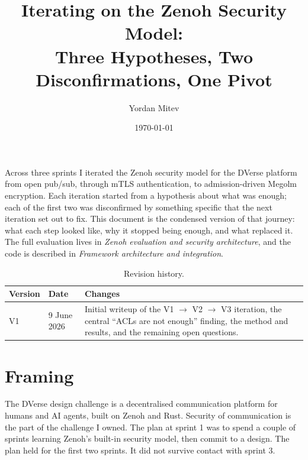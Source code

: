\documentclass[11pt,a4paper]{article}
\title{%
  \vspace{-1cm}
  {\LARGE\bfseries Iterating on the Zenoh Security Model:\\
  Three Hypotheses, Two Disconfirmations, One Pivot}
}
\author{Yordan Mitev}
\date{\today}
\begin{document}
\maketitle
\thispagestyle{fancy}

\begin{abstractbox}
  Across three sprints I iterated the Zenoh security model for the
  DVerse platform from open pub/sub, through mTLS authentication,
  to admission-driven Megolm encryption. Each iteration started
  from a hypothesis about what was enough; each of the first two
  was disconfirmed by something specific that the next iteration
  set out to fix. This document is the condensed version of that
  journey: what each step looked like, why it stopped being
  enough, and what replaced it. The full evaluation lives in
  \emph{Zenoh evaluation and security architecture}, and the code
  is described in \emph{Framework architecture and integration}.
\end{abstractbox}

\vspace{1em}

\begin{table}[H]
  \centering
  \small
  \begin{tabular}{|l|l|p{8cm}|}
    \hline
    \rowcolor{gray!15}
    \textbf{Version} & \textbf{Date} & \textbf{Changes} \\
    \hline
    V1 & 9 June 2026 & Initial writeup of the V1 \(\rightarrow\)
    V2 \(\rightarrow\) V3 iteration, the central ``ACLs are not
    enough'' finding, the method and results, and the remaining
    open questions. \\
    \hline
  \end{tabular}
  \caption{Revision history.}
  \label{tab:iter-history}
\end{table}

\newpage
\tableofcontents
\newpage

\section{Framing}

The DVerse design challenge is a decentralised communication
platform for humans and AI agents, built on Zenoh and Rust. Security
of communication is the part of the challenge I owned. The plan at
sprint 1 was to spend a couple of sprints learning Zenoh's built-in
security model, then commit to a design. The plan held for the
first two sprints. It did not survive contact with sprint 3.
\end{document}
